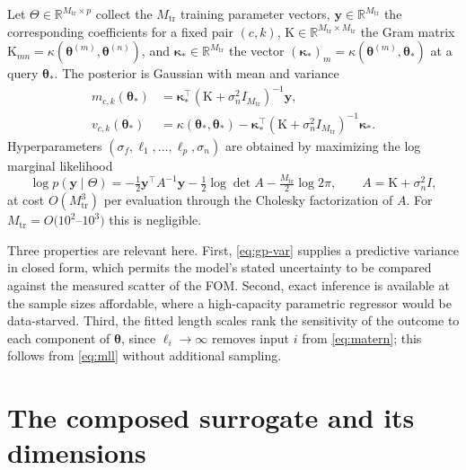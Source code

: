 \documentclass[11pt]{article}
\newcommand{\R}{\mathbb{R}}
\newcommand{\bs}[1]{\boldsymbol{#1}}
\begin{document}
Let $\Theta \in \R^{M_{\mathrm{tr}} \times p}$ collect the $M_{\mathrm{tr}}$ training
parameter vectors, $\bs{y} \in \R^{M_{\mathrm{tr}}}$ the corresponding coefficients for a
fixed pair $(c,k)$, $\mathrm{K} \in \R^{M_{\mathrm{tr}} \times M_{\mathrm{tr}}}$ the Gram
matrix $\mathrm{K}_{mn} = \kappa(\bs{\theta}^{(m)}, \bs{\theta}^{(n)})$, and
$\bs{\kappa}_\ast \in \R^{M_{\mathrm{tr}}}$ the vector
$(\bs{\kappa}_\ast)_m = \kappa(\bs{\theta}^{(m)}, \bs{\theta}_\ast)$ at a query
$\bs{\theta}_\ast$. The posterior is Gaussian with mean and variance
\begin{align}
  m_{c,k}(\bs{\theta}_\ast) &= \bs{\kappa}_\ast^{\top}
    \left( \mathrm{K} + \sigma_n^2 I_{M_{\mathrm{tr}}} \right)^{-1} \bs{y},
  \label{eq:gp-mean} \\
  v_{c,k}(\bs{\theta}_\ast) &= \kappa(\bs{\theta}_\ast, \bs{\theta}_\ast)
    - \bs{\kappa}_\ast^{\top}
    \left( \mathrm{K} + \sigma_n^2 I_{M_{\mathrm{tr}}} \right)^{-1} \bs{\kappa}_\ast .
  \label{eq:gp-var}
\end{align}
Hyperparameters $(\sigma_f, \ell_1, \ldots, \ell_p, \sigma_n)$ are obtained by maximizing the
log marginal likelihood
\begin{equation}
  \log p(\bs{y} \mid \Theta) = -\tfrac{1}{2} \bs{y}^{\top} A^{-1} \bs{y}
  - \tfrac{1}{2} \log \det A - \tfrac{M_{\mathrm{tr}}}{2} \log 2\pi,
  \qquad A = \mathrm{K} + \sigma_n^2 I ,
  \label{eq:mll}
\end{equation}
at cost $O(M_{\mathrm{tr}}^3)$ per evaluation through the Cholesky factorization of $A$. For
$M_{\mathrm{tr}} = O(10^2$--$10^3)$ this is negligible.

Three properties are relevant here. First, \eqref{eq:gp-var} supplies a predictive variance
in closed form, which permits the model's stated uncertainty to be compared against the
measured scatter of the FOM. Second, exact inference is available at the sample sizes
affordable, where a high-capacity parametric regressor would be data-starved. Third, the
fitted length scales rank the sensitivity of the outcome to each component of $\bs{\theta}$,
since $\ell_i \to \infty$ removes input $i$ from \eqref{eq:matern}; this follows from
\eqref{eq:mll} without additional sampling.

\section{The composed surrogate and its dimensions}
\label{sec:dimensions}
\end{document}
